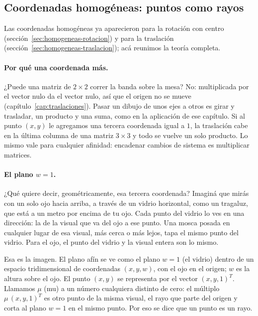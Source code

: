 \subsection{Coordenadas homogéneas: puntos como rayos}\label{sec:homogeneas-primera}

Las coordenadas homogéneas ya aparecieron para la rotación con centro
(sección~\ref{sec:homogeneas-rotacion}) y para la traslación
(sección~\ref{sec:homogeneas-traslacion}); acá reunimos la teoría completa.

\paragraph{Por qué una coordenada más.}
¿Puede una matriz de \(2\times2\) correr la banda sobre la mesa? No: multiplicada por el vector
nulo da el vector nulo, así que el origen no se mueve (capítulo~\ref{cap:traslaciones}). Pasar
un dibujo de unos ejes a otros es girar y trasladar, un producto y una suma, como en la
aplicación de ese capítulo. Si al punto \((x,y)\) le agregamos una tercera
coordenada igual a \(1\), la traslación cabe en la última columna de una matriz \(3\times3\) y
todo se vuelve un solo producto. Lo mismo vale para cualquier afinidad: encadenar cambios de
sistema es multiplicar matrices.

\paragraph{El plano \(w=1\).}
¿Qué quiere decir, geométricamente, esa tercera coordenada? Imaginá que mirás con un solo ojo
hacia arriba, a través de un vidrio horizontal, como un tragaluz, que está a un metro por
encima de tu ojo. Cada punto del vidrio lo ves en una dirección: la de la visual que va del ojo
a ese punto. Una mosca posada en cualquier lugar de esa visual, más cerca o más lejos, tapa el
mismo punto del vidrio. Para el ojo, el punto del vidrio y la visual entera son lo mismo.

Esa es la imagen. El plano afín se ve como el plano \(w=1\) (el vidrio) dentro de un espacio
tridimensional de coordenadas \((x,y,w)\), con el ojo en el origen; \(w\) es la altura sobre
el ojo. El punto \((x,y)\) se representa por el vector \((x,y,1)^T\). Llamamos \(\mu\) (mu) a un
número cualquiera distinto de cero: el múltiplo \(\mu\,(x,y,1)^T\) es otro punto de la misma
visual, el rayo que parte del origen y corta al plano \(w=1\) en el mismo punto. Por eso se
dice que un punto es un rayo.

